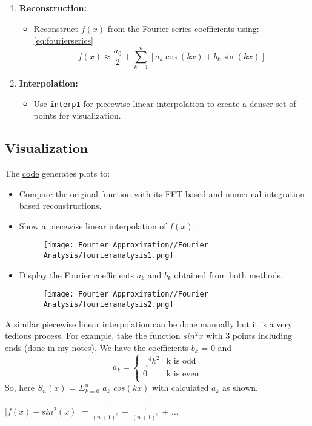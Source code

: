 \documentclass[12pt]{report} %
\begin{document}
\begin{enumerate}
    \item \textbf{Reconstruction:}
    \begin{itemize}
        \item Reconstruct \( f(x) \) from the Fourier series coefficients using:\ref{eq:fourierseries}
        \[
        f(x) \approx \frac{a_0}{2} + \sum_{k=1}^{n} \left[ a_k \cos(kx) + b_k \sin(kx) \right]
        \]
    \end{itemize}
    
    \item \textbf{Interpolation:}
    \begin{itemize}
        \item Use \texttt{interp1} for piecewise linear interpolation to create a denser set of points for visualization.
    \end{itemize}
\end{enumerate}

\subsection*{Visualization}
The \href{https://github.com/abhx7/PseudoSpectral-Methods-in-Optimal-Control/blob/main/Codes/fourier_coefficients_fft_vs_trapz.m}{code} generates plots to:
\begin{itemize}
    \item Compare the original function with its FFT-based and numerical integration-based reconstructions.
    \item Show a piecewise linear interpolation of \( f(x) \).
    \begin{figure}[H]
        \centering
        \texttt{[image: Fourier Approximation//Fourier Analysis/fourieranalysis1.png]}
        \label{fig:enter-label}
    \end{figure}
    \item Display the Fourier coefficients \( a_k \) and \( b_k \) obtained from both methods.
    \begin{figure}[H]
        \centering
        \texttt{[image: Fourier Approximation//Fourier Analysis/fourieranalysis2.png]}
        \label{fig:enter-label}
    \end{figure}
\end{itemize}

\dotfill

\noindent A similar piecewise linear interpolation can be done manually but it is a very tedious process. For example, take the function  $sin^2 x$ with 3 points including ends (done in my notes). We have the coefficients $b_k$ = 0 and 
\[
a_k = 
\begin{cases} 
\frac{-4}\pi k^2 & \text{k is odd}\\
0 & \text{k is even} \\
\end{cases}
\]
So, here $S_n (x)$ = $\Sigma_{k = 0}^n$ $a_k$ $cos(kx)$ with calculated $a_k$ as shown.\\\\
$\lvert f(x) - sin^2(x) \rvert$ = $\frac{1}{(n+1)^2}$ + $\frac{1}{(n+1)^2}$ + $\ldots$\\\\
\end{document}
